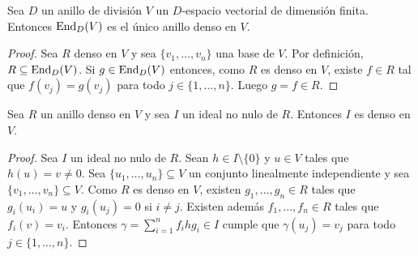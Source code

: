 %
%

\begin{lemma}
	\label{lem:unico_denso}
	Sea $D$ un anillo de división 
	$V$ un $D$-espacio vectorial de dimensión finita. Entonces $\operatorname{End}_D(V)$ es
	el único anillo denso en $V$.
\end{lemma}

\begin{proof}
	Sea $R$ denso en $V$ y sea $\{v_1,\dots,v_n\}$ una base de $V$. Por
	definición, $R\subseteq\operatorname{End}_D(V)$. Si $g\in\operatorname{End}_D(V)$ entonces, como $R$ es
	denso en $V$, existe $f\in R$ tal que $f(v_j)=g(v_j)$ para todo
	$j\in\{1,\dots,n\}$. Luego $g=f\in R$.
\end{proof}

\begin{lemma}
	\label{lem:ideal_denso}
	Sea $R$ un anillo denso en $V$ y sea $I$ un ideal no nulo de $R$. Entonces
	$I$ es denso en $V$.
\end{lemma}

\begin{proof}
	Sea $I$ un ideal no nulo de $R$. Sean $h\in I\setminus\{0\}$ y $u\in V$
	tales que $h(u)=v\ne0$. Sea $\{u_1,\dots,u_n\}\subseteq V$ un conjunto
	linealmente independiente y sea $\{v_1,\dots,v_n\}\subseteq V$. Como $R$ es
	denso en $V$, existen $g_1,\dots,g_n\in R$ tales que $g_i(u_i)=u$ y
	$g_i(u_j)=0$ si $i\ne j$. Existen además $f_1,\dots,f_n\in R$ tales que
	$f_i(v)=v_i$. Entonces $\gamma=\sum_{i=1}^n f_ihg_i\in I$ cumple que
	$\gamma(u_j)=v_j$ para todo $j\in\{1,\dots,n\}$.
\end{proof}

